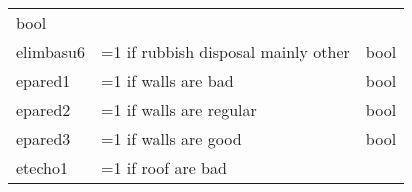 \documentclass[11pt]{article}
\begin{document}
\begin{longtable}[]{@{}lll@{}}
\begin{minipage}[t]{0.24\columnwidth}
bool\strut
\end{minipage}\tabularnewline
\begin{minipage}[t]{0.19\columnwidth}\raggedright\strut
elimbasu6\strut
\end{minipage} & \begin{minipage}[t]{0.16\columnwidth}\raggedright\strut
=1 if rubbish disposal mainly other\strut
\end{minipage} & \begin{minipage}[t]{0.24\columnwidth}\raggedright\strut
bool\strut
\end{minipage}\tabularnewline
\begin{minipage}[t]{0.19\columnwidth}\raggedright\strut
epared1\strut
\end{minipage} & \begin{minipage}[t]{0.16\columnwidth}\raggedright\strut
=1 if walls are bad\strut
\end{minipage} & \begin{minipage}[t]{0.24\columnwidth}\raggedright\strut
bool\strut
\end{minipage}\tabularnewline
\begin{minipage}[t]{0.19\columnwidth}\raggedright\strut
epared2\strut
\end{minipage} & \begin{minipage}[t]{0.16\columnwidth}\raggedright\strut
=1 if walls are regular\strut
\end{minipage} & \begin{minipage}[t]{0.24\columnwidth}\raggedright\strut
bool\strut
\end{minipage}\tabularnewline
\begin{minipage}[t]{0.19\columnwidth}\raggedright\strut
epared3\strut
\end{minipage} & \begin{minipage}[t]{0.16\columnwidth}\raggedright\strut
=1 if walls are good\strut
\end{minipage} & \begin{minipage}[t]{0.24\columnwidth}\raggedright\strut
bool\strut
\end{minipage}\tabularnewline
\begin{minipage}[t]{0.19\columnwidth}\raggedright\strut
etecho1\strut
\end{minipage} & \begin{minipage}[t]{0.16\columnwidth}\raggedright\strut
=1 if roof are bad\strut
\end{minipage} & \begin{minipage}[t]{0.24\columnwidth}\raggedright\strut

\end{minipage}
\end{longtable}
\end{document}
